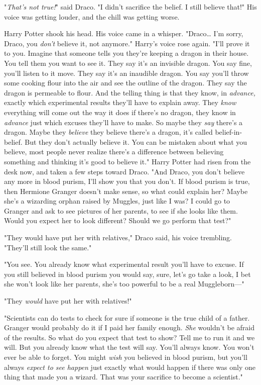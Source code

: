 "\emph{That's not true!}" said Draco. "I didn't sacrifice the belief. I still
believe that!" His voice was getting louder, and the chill was getting worse.

Harry Potter shook his head. His voice came in a whisper. "Draco{\ldots} I'm
sorry, Draco, you \emph{don't} believe it, not anymore." Harry's voice rose
again. "I'll prove it to you. Imagine that someone tells you they're keeping a
dragon in their house. You tell them you want to see it. They say it's an
invisible dragon. You say fine, you'll listen to it move. They say it's an
inaudible dragon. You say you'll throw some cooking flour into the air and see
the outline of the dragon. They say the dragon is permeable to flour. And the
telling thing is that they know, in \emph{advance,} exactly which experimental
results they'll have to explain away. They \emph{know} everything will come out
the way it does if there's no dragon, they know in \emph{advance} just which
excuses they'll have to make. So maybe they \emph{say} there's a dragon. Maybe
they \emph{believe} they believe there's a dragon, it's called
belief-in-belief. But they don't actually believe it. You can be mistaken about
what you believe, most people never realize there's a difference between
believing something and thinking it's good to believe it." Harry Potter had
risen from the desk now, and taken a few steps toward Draco. "And Draco, you
don't believe any more in blood purism, I'll show you that you don't. If blood
purism is true, then Hermione Granger doesn't make sense, so what could explain
her? Maybe she's a wizarding orphan raised by Muggles, just like I was? I could
go to Granger and ask to see pictures of her parents, to see if she looks like
them. Would you expect her to look different? Should we go perform that test?"

"They would have put her with relatives," Draco said, his voice trembling.
"They'll still look the same."

"You see. You already know what experimental result you'll have to excuse. If
you still believed in blood purism you would say, sure, let's go take a look, I
bet she won't look like her parents, she's too powerful to be a real
Muggleborn---"

"They \emph{would} have put her with relatives!"

"Scientists can do tests to check for sure if someone is the true child of a
father. Granger would probably do it if I paid her family enough. \emph{She}
wouldn't be afraid of the results. So what do you expect that test to show?
Tell me to run it and we will. But you already know what the test will say.
You'll always know. You won't ever be able to forget. You might \emph{wish} you
believed in blood purism, but you'll always \emph{expect to see happen} just
exactly what would happen if there was only one thing that made you a wizard.
That was your sacrifice to become a scientist."


